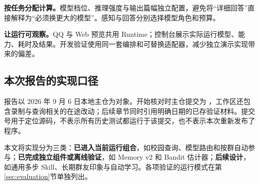 \textbf{按任务分配计算。}模型档位、推理强度与输出篇幅独立配置，避免将“详细回答”直接解释为“必须换更大的模型”。感知与回答分别选择模型角色和预算。

\textbf{让运行可观察。}QQ 与 Web 预览共用 Runtime；控制台展示实际运行模型、能力、耗时及结果。开发验证使用同一套编排和可替换适配器，减少独立演示实现带来的偏差。

\subsection{本次报告的实现口径}
报告以 2026 年 9 月 6 日本地主仓为对象。开始核对时主仓提交为 ，工作区还包含录制与查询相关的在途改动；后续章节同时引用明确日期的已存验证材料。提交号用于定位源码，不表示所有历史测试都运行于该提交，也不表示本次重新发布了程序。

本文将实现分为三类：\textbf{已进入当前运行组合}，如校园查询、模型路由和按群自动参与；\textbf{已完成独立组件或离线验证}，如 Memory v2 和 Bandit 估计器；\textbf{后续设计}，如通用多步 Skill、长期群友印象与自动学习。各项验证的运行模式在第\ref{sec:evaluation}节单独列出。
